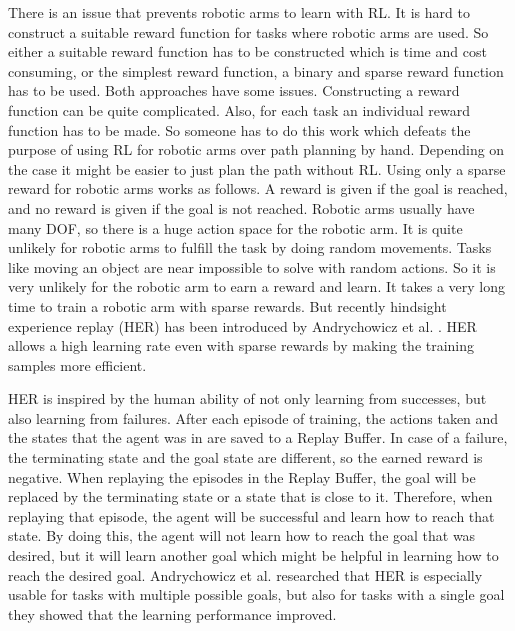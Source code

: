There is an issue that prevents robotic arms to learn with RL. It is hard to construct a suitable reward function for tasks where robotic arms are used. 
So either a suitable reward function has to be constructed which is time and cost consuming, or the simplest reward function, a binary and sparse reward function has to be used. Both approaches have some issues. 
\newline
Constructing a reward function can be quite complicated. Also, for each task an individual reward function has to be made. So someone has to do this work which defeats the purpose of using RL for robotic arms over path planning by hand. Depending on the case it might be easier to just plan the path without RL.
\newline
Using only a sparse reward for robotic arms works as follows. A reward is given if the goal is reached, and no reward is given if the goal is not reached. Robotic arms usually have many DOF, so there is a huge action space for the robotic arm. It is quite unlikely for robotic arms to fulfill the task by doing random movements. Tasks like moving an object are near impossible to solve with random actions. 
So it is very unlikely for the robotic arm to earn a reward and learn. It takes a very long time to train a robotic arm with sparse rewards.
But recently hindsight experience replay (HER) has been introduced by Andrychowicz et al. \cite{herpaper}.
HER allows a high learning rate even with sparse rewards by making the training samples more efficient. 

\vspace{0.5cm}

HER is inspired by the human ability of not only learning from successes, but also learning from failures. After each episode of training, the actions taken and the states that the agent was in are saved to a Replay Buffer. In case of a failure, the terminating state and the goal state are different, so the earned reward is negative. When replaying the episodes in the Replay Buffer, the goal will be replaced by the terminating state or a state that is close to it. Therefore, when replaying that episode, the agent will be successful and learn how to reach that state. By doing this, the agent will not learn how to reach the goal that was desired, but it will learn another goal which might be helpful in learning how to reach the desired goal. Andrychowicz et al. \cite{herpaper} researched that HER is especially usable for tasks with multiple possible goals, but also for tasks with a single goal they showed that the learning performance improved.

